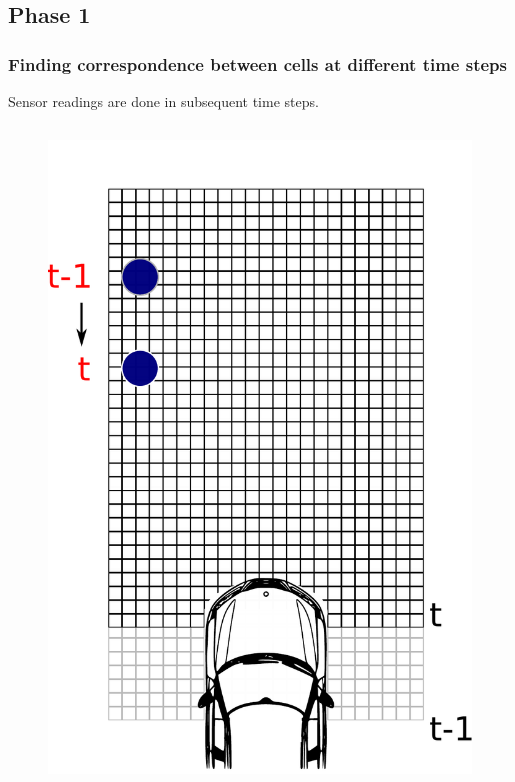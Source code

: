\documentclass{beamer}
\begin{document}
\subsection{Phase 1}

	\begin{frame}
		\frametitle{Finding correspondence between cells at different time steps}

		Sensor readings are done in subsequent time steps.

		  \begin{columns}[t]
		  \begin{column}{5cm}
			\begin{figure}[h]
			\center
			\includegraphics[scale=0.2]{img/fig:motion:algorithm:nonstatic:02}
		\end{figure}	
		  \end{column}
		  

\end{columns}
\end{frame}
\end{document}
